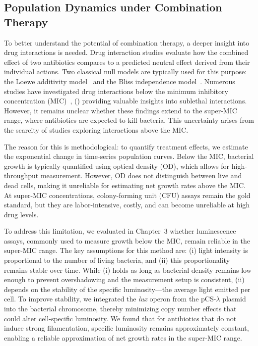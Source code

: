 \documentclass[../main.tex]{subfiles}
\begin{document}
\subsection{Population Dynamics under Combination Therapy}
To better understand the potential of combination therapy, a deeper insight into drug interactions is needed.
Drug interaction studies evaluate how the combined effect of two antibiotics compares to a predicted neutral effect derived from their individual actions.
Two classical null models are typically used for this purpose: the Loewe additivity model~\cite{Loewe1926} and the Bliss independence model~\cite{Bliss1939}.
Numerous studies have investigated drug interactions below the minimum inhibitory concentration (MIC)~\cite{Yeh2006}, (\cite{...}) providing valuable insights into sublethal interactions.
However, it remains unclear whether these findings extend to the super-MIC range, where antibiotics are expected to kill bacteria.
This uncertainty arises from the scarcity of studies exploring interactions above the MIC.

The reason for this is methodological: to quantify treatment effects, we estimate the exponential change in time-series population curves.
Below the MIC, bacterial growth is typically quantified using optical density (OD), which allows for high-throughput measurement.
However, OD does not distinguish between live and dead cells, making it unreliable for estimating net growth rates above the MIC.
At super-MIC concentrations, colony-forming unit (CFU) assays remain the gold standard, but they are labor-intensive, costly, and can become unreliable at high drug levels.

To address this limitation, we evaluated in Chapter~3 whether luminescence assays\cite{Kishony2003}, commonly used to measure growth below the MIC, remain reliable in the super-MIC range.
The key assumptions for this method are: (i) light intensity is proportional to the number of living bacteria, and (ii) this proportionality remains stable over time.
While (i) holds as long as bacterial density remains low enough to prevent overshadowing and the measurement setup is consistent, (ii) depends on the stability of the specific luminosity---the average light emitted per cell.
To improve stability, we integrated the \textit{lux} operon from the pCS-$\lambda$ plasmid into the bacterial chromosome, thereby minimizing copy number effects that could alter cell-specific luminosity.
We found that for antibiotics that do not induce strong filamentation, specific luminosity remains approximately constant, enabling a reliable approximation of net growth rates in the super-MIC range.
\end{document}
